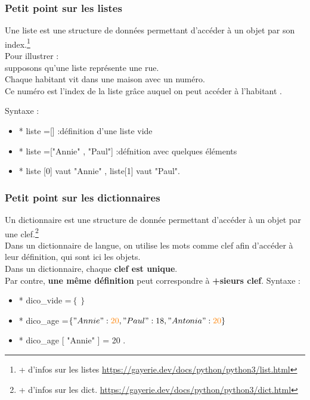 \begin{frame}
  \frametitle{Petit point sur les listes}
   Une liste est une structure de données permettant d'accéder
à un objet par son index.\footnote{+ d'infos sur les listes \url{https://gayerie.dev/docs/python/python3/list.html}}\\


 Pour illustrer :\\
 supposons qu'une liste représente une rue.\\
Chaque habitant vit dans une maison avec un numéro.\\
 Ce numéro est l'index de la liste grâce auquel on peut accéder
à l'habitant .


Syntaxe :
\begin{itemize}
\item* liste =[] :définition d'une liste vide
\item* liste =["Annie" , "Paul"] :défnition avec quelques éléments
\item* liste [0] vaut "Annie" , liste[1] vaut "Paul".
\end{itemize}



\end{frame}
\begin{frame}
  \frametitle{Petit point sur les dictionnaires}

 Un dictionnaire est une structure de donnée permettant
d'accéder à un objet par une clef.\footnote{+ d'infos sur les dict. \url{https://gayerie.dev/docs/python/python3/dict.html}}\\
 Dans un dictionnaire de langue, on utilise les mots
comme clef afin d'accéder à leur définition, qui sont ici
les objets.\\
 Dans un dictionnaire, chaque \textbf{clef est unique}.\\
 Par contre, \textbf{une même définition} peut correspondre à
\textbf{+sieurs clef}.
Syntaxe :
\begin{itemize}
\item* dico\_vide =$\left\{\right\}$
\item* dico\_age =$\left\{ "Annie" : \textcolor{orange}{20} , "Paul" :18, "Antonia":  \textcolor{orange}{20} \right\}$
\item* dico\_age [ "Annie" ] = 20 .
\end{itemize}
\end{frame}

